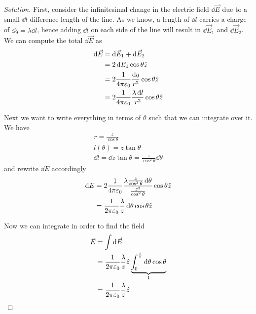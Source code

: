 \documentclass[12pt]{extarticle}
\begin{document}
\begin{proof}[Solution]
    First, consider the infinitesimal change in the electric field $\dd{\vec E}$ due to a small $\dd{l}$ difference length of the line.
    As we know, a length of $\dd{l}$ carries a charge of $\dd{q} = \lambda \dd{l}$, hence adding $\dd{l}$ on each side of the line will result in $\dd{\vec E_1}$ and $\dd{\vec E_2}$.
    We can compute the total $\dd{\vec E}$ as
    \begin{align}
        \dd{\vec E} & = \dd{\vec E_1} + \dd{\vec E_2}                                                \\
                    & = 2 \dd{E_1} \cos \theta \hat z                                                \\
                    & = 2\frac{1}{4 \pi \varepsilon_0} \frac{\dd{q}}{r^2} \cos \theta \hat z         \\
                    & = 2\frac{1}{4 \pi \varepsilon_0} \frac{\lambda \dd{l}}{r^2} \cos \theta \hat z
    \end{align}

    Next we want to write everything in terms of $\theta$ such that we can integrate over it.
    We have
    \begin{gather}
        r         = \frac{z}{\cos \theta}                                      \\
        l(\theta) = z \tan \theta                                              \\
        \dd{l}    = \dd{z \tan \theta} = \frac{z}{\cos^2 \theta} \dd{\theta}
    \end{gather}
    and rewrite $\dd{E}$ accordingly
    \begin{align}
        \dd{E} & = 2\frac{1}{4 \pi \varepsilon_0} \frac{\lambda \frac{z}{\cos^2 \theta} \dd{\theta}}{\frac{z^2}{\cos^2 \theta}} \cos \theta \hat z \\
               & = \frac{1}{2 \pi \varepsilon_0} \frac{\lambda}{z} \dd{\theta} \cos \theta \hat z
    \end{align}

    Now we can integrate in order to find the field
    \begin{align}
        \vec E & = \int \dd{\vec E}                                                                                                       \\
               & = \frac{1}{2 \pi \varepsilon_0} \frac{\lambda}{z} \hat z \underbrace{\int_0^{\frac{\pi}{2}} \dd{\theta} \cos \theta}_{1} \\
               & = \frac{1}{2 \pi \varepsilon_0} \frac{\lambda}{z} \hat z
    \end{align}
\end{proof}
\end{document}
